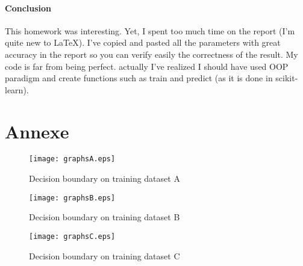 \documentclass[11pt]{article}
\numberwithin{figure}{section} %
\begin{document}
\paragraph{\textbf{Conclusion}}
This homework was interesting. Yet, I spent too much time on the report (I'm quite new to LaTeX). I've copied and pasted all the parameters with great accuracy in the report so you can verify easily the correctness of the result. My code is far from being perfect. actually I've realized I should have used OOP paradigm and create functions such as train and predict (as it is done in scikit-learn).

\newpage
\section{Annexe}
\begin{figure}[H] 
  \centering
	\captionsetup{justification=centering}
	\texttt{[image: graphsA.eps]}
  \caption{Decision boundary on training dataset A}
	\label{fig:GraphA}
\end{figure}

\begin{figure}[H] 
  \centering
	\captionsetup{justification=centering}
	\texttt{[image: graphsB.eps]}
  \caption{Decision boundary on training dataset B}
	\label{fig:GraphB}
\end{figure}

\begin{figure}[H] 
  \centering
	\captionsetup{justification=centering}
	\texttt{[image: graphsC.eps]}
  \caption{Decision boundary on training dataset C}
	\label{fig:GraphC}
\end{figure}
\end{document}
